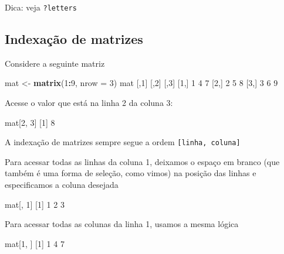 \documentclass[10pt,a4paper]{book}
\newenvironment{Shaded}{\begin{snugshade}}{\end{snugshade}}
\newcommand{\KeywordTok}[1]{\textcolor[rgb]{0.13,0.29,0.53}{\textbf{#1}}}
\newcommand{\DataTypeTok}[1]{\textcolor[rgb]{0.13,0.29,0.53}{#1}}
\newcommand{\DecValTok}[1]{\textcolor[rgb]{0.00,0.00,0.81}{#1}}
\newcommand{\StringTok}[1]{\textcolor[rgb]{0.31,0.60,0.02}{#1}}
\newcommand{\OperatorTok}[1]{\textcolor[rgb]{0.81,0.36,0.00}{\textbf{#1}}}
\newcommand{\NormalTok}[1]{#1}
\begin{document}
Dica: veja \texttt{?letters}

\subsection{Indexação de matrizes}\label{indexauxe7uxe3o-de-matrizes}

Considere a seguinte matriz

\begin{Shaded}
\begin{Highlighting}[]
\NormalTok{mat <-}\StringTok{ }\KeywordTok{matrix}\NormalTok{(}\DecValTok{1}\OperatorTok{:}\DecValTok{9}\NormalTok{, }\DataTypeTok{nrow =} \DecValTok{3}\NormalTok{)}
\NormalTok{mat}
\NormalTok{     [,}\DecValTok{1}\NormalTok{] [,}\DecValTok{2}\NormalTok{] [,}\DecValTok{3}\NormalTok{]}
\NormalTok{[}\DecValTok{1}\NormalTok{,]    }\DecValTok{1}    \DecValTok{4}    \DecValTok{7}
\NormalTok{[}\DecValTok{2}\NormalTok{,]    }\DecValTok{2}    \DecValTok{5}    \DecValTok{8}
\NormalTok{[}\DecValTok{3}\NormalTok{,]    }\DecValTok{3}    \DecValTok{6}    \DecValTok{9}
\end{Highlighting}
\end{Shaded}

Acesse o valor que está na linha 2 da coluna 3:

\begin{Shaded}
\begin{Highlighting}[]
\NormalTok{mat[}\DecValTok{2}\NormalTok{, }\DecValTok{3}\NormalTok{]}
\NormalTok{[}\DecValTok{1}\NormalTok{] }\DecValTok{8}
\end{Highlighting}
\end{Shaded}

A indexação de matrizes sempre segue a ordem
\texttt{{[}linha,\ coluna{]}}

Para acessar todas as linhas da coluna 1, deixamos o espaço em branco
(que também é uma forma de seleção, como vimos) na posição das linhas e
especificamos a coluna desejada

\begin{Shaded}
\begin{Highlighting}[]
\NormalTok{mat[, }\DecValTok{1}\NormalTok{]}
\NormalTok{[}\DecValTok{1}\NormalTok{] }\DecValTok{1} \DecValTok{2} \DecValTok{3}
\end{Highlighting}
\end{Shaded}

Para acessar todas as colunas da linha 1, usamos a mesma lógica

\begin{Shaded}
\begin{Highlighting}[]
\NormalTok{mat[}\DecValTok{1}\NormalTok{, ]}
\NormalTok{[}\DecValTok{1}\NormalTok{] }\DecValTok{1} \DecValTok{4} \DecValTok{7}
\end{Highlighting}
\end{Shaded}
\end{document}
